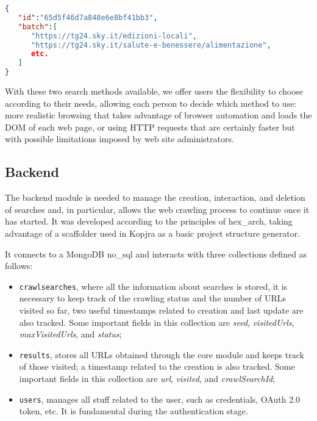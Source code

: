 \documentclass[../thesis.tex]{subfiles}
\begin{document}
\begin{lstlisting}[language=json, captionpos=b, caption={[Sample of core response message]Example of a response message sent by the core.}, label={code:response_msg_core}]
{
   "id":"65d5f46d7a848e6e8bf41bb3",
   "batch":[
      "https://tg24.sky.it/edizioni-locali",
      "https://tg24.sky.it/salute-e-benessere/alimentazione",
      etc.
   ]
}
\end{lstlisting}

With these two search methods available, we offer users the flexibility to choose according to their needs, allowing each person to decide which method to use: more realistic browsing that takes advantage of browser automation and loads the \acrshort{DOM} of each web page, or using \acrshort{HTTP} requests that are certainly faster but with possible limitations imposed by web site administrators.

\subsection{Backend}
The backend module is needed to manage the creation, interaction, and deletion of searches and, in particular, allows the web crawling process to continue once it has started. It was developed according to the principles of \gls{hex_arch}, taking advantage of a scaffolder used in Kopjra as a basic project structure generator.

It connects to a MongoDB \gls{no_sql} and interacts with three collections defined as follows:

\begin{itemize}
    \item \texttt{crawlsearches}, where all the information about searches is stored, it is necessary to keep track of the crawling status and the number of \acrshort{URL}s visited so far, two useful timestamps related to creation and last update are also tracked. Some important fields in this collection are \textit{seed}, \textit{visitedUrls}, \textit{maxVisitedUrls}, and \textit{status};
    \item \texttt{results}, stores all \acrshort{URL}s obtained through the core module and keeps track of those visited; a timestamp related to the creation is also tracked. Some important fields in this collection are \textit{url}, \textit{visited}, and \textit{crawlSearchId};
    \item \texttt{users}, manages all stuff related to the user, such as credentials, \acrshort{OAuth 2.0} token, etc. It is fundamental during the authentication stage.
\end{itemize}
\end{document}
